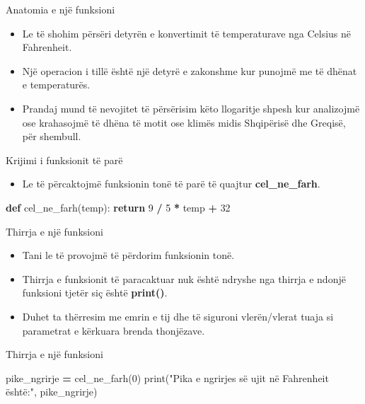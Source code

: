 \documentclass[
  ignorenonframetext,
]{beamer}
\newenvironment{Shaded}{\begin{snugshade}}{\end{snugshade}}
\newcommand{\BuiltInTok}[1]{#1}
\newcommand{\ControlFlowTok}[1]{\textcolor[rgb]{0.13,0.29,0.53}{\textbf{#1}}}
\newcommand{\DecValTok}[1]{\textcolor[rgb]{0.00,0.00,0.81}{#1}}
\newcommand{\KeywordTok}[1]{\textcolor[rgb]{0.13,0.29,0.53}{\textbf{#1}}}
\newcommand{\NormalTok}[1]{#1}
\newcommand{\OperatorTok}[1]{\textcolor[rgb]{0.81,0.36,0.00}{\textbf{#1}}}
\newcommand{\StringTok}[1]{\textcolor[rgb]{0.31,0.60,0.02}{#1}}
\providecommand{\tightlist}{%
  \setlength{\itemsep}{0pt}\setlength{\parskip}{0pt}}
\begin{document}
\begin{frame}{Anatomia e një funksioni}
\protect\hypertarget{anatomia-e-njuxeb-funksioni}{}
\begin{itemize}
\item
  Le të shohim përsëri detyrën e konvertimit të temperaturave nga
  Celsius në Fahrenheit.
\item
  Një operacion i tillë është një detyrë e zakonshme kur punojmë me të
  dhënat e temperaturës.
\item
  Prandaj mund të nevojitet të përsërisim këto llogaritje shpesh kur
  analizojmë ose krahasojmë të dhëna të motit ose klimës midis
  Shqipërisë dhe Greqisë, për shembull.
\end{itemize}
\end{frame}

\begin{frame}[fragile]{Krijimi i funksionit të parë}
\protect\hypertarget{krijimi-i-funksionit-tuxeb-paruxeb}{}
\begin{itemize}
\tightlist
\item
  Le të përcaktojmë funksionin tonë të parë të quajtur
  \textbf{cel\_ne\_farh}.
\end{itemize}

\begin{Shaded}
\begin{Highlighting}[]
\KeywordTok{def}\NormalTok{ cel\_ne\_farh(temp):}
    \ControlFlowTok{return} \DecValTok{9} \OperatorTok{/} \DecValTok{5} \OperatorTok{*}\NormalTok{ temp }\OperatorTok{+} \DecValTok{32}
\end{Highlighting}
\end{Shaded}
\end{frame}

\begin{frame}{Thirrja e një funksioni}
\protect\hypertarget{thirrja-e-njuxeb-funksioni}{}
\begin{itemize}
\item
  Tani le të provojmë të përdorim funksionin tonë.
\item
  Thirrja e funksionit të paracaktuar nuk është ndryshe nga thirrja e
  ndonjë funksioni tjetër siç është \textbf{print()}.
\item
  Duhet ta thërresim me emrin e tij dhe të siguroni vlerën/vlerat tuaja
  si parametrat e kërkuara brenda thonjëzave.
\end{itemize}
\end{frame}

\begin{frame}[fragile]{Thirrja e një funksioni}
\protect\hypertarget{thirrja-e-njuxeb-funksioni-1}{}
\begin{Shaded}
\begin{Highlighting}[]
\NormalTok{pike\_ngrirje }\OperatorTok{=}\NormalTok{ cel\_ne\_farh(}\DecValTok{0}\NormalTok{)}
\BuiltInTok{print}\NormalTok{(}\StringTok{"Pika e ngrirjes së ujit në Fahrenheit është:"}\NormalTok{, pike\_ngrirje)}
\end{Highlighting}
\end{Shaded}
\end{frame}
\end{document}
